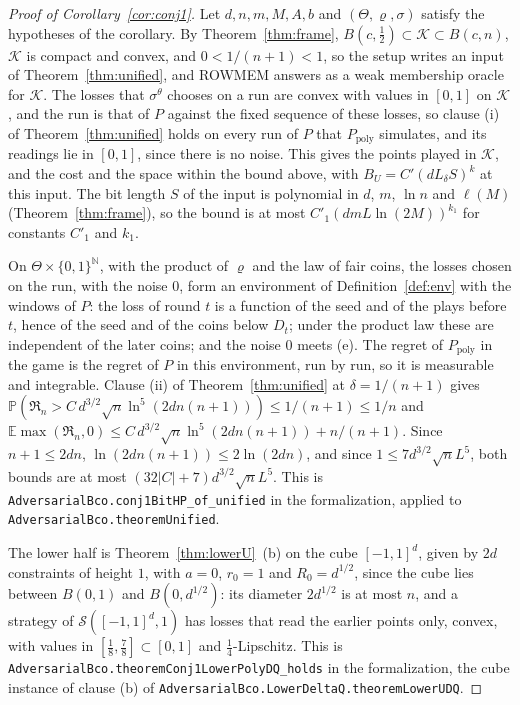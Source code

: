 \documentclass[11pt]{amsart}
\theoremstyle{definition}
\numberwithin{equation}{section}
\newcommand{\E}{\mathbb{E}}
\newcommand{\Prob}{\mathbb{P}}
\newcommand{\cK}{\mathcal{K}}
\newcommand{\Reg}{\mathfrak{R}}
\begin{document}
\begin{proof}[Proof of Corollary~\ref{cor:conj1}]
Let $d,n,m,M,A,b$ and $(\Theta,\varrho,\sigma)$ satisfy the hypotheses of the corollary. By Theorem~\ref{thm:frame}, $B(c,\frac12)\subset\cK\subset B(c,n)$, $\cK$ is compact and convex, and $0<1/(n+1)<1$, so the setup writes an input of Theorem~\ref{thm:unified}, and ROWMEM answers as a weak membership oracle for $\cK$. The losses that $\sigma^\theta$ chooses on a run are convex with values in $[0,1]$ on $\cK$, and the run is that of $P$ against the fixed sequence of these losses, so clause (i) of Theorem~\ref{thm:unified} holds on every run of $P$ that $P_{\mathrm{poly}}$ simulates, and its readings lie in $[0,1]$, since there is no noise. This gives the points played in $\cK$, and the cost and the space within the bound above, with $B_U=C'(dL_\delta S)^k$ at this input. The bit length $S$ of the input is polynomial in $d$, $m$, $\ln n$ and $\ell(M)$ (Theorem~\ref{thm:frame}), so the bound is at most $C'_1(dmL\ln(2M))^{k_1}$ for constants $C'_1$ and $k_1$.

On $\Theta\times\{0,1\}^{\mathbb N}$, with the product of $\varrho$ and the law of fair coins, the losses chosen on the run, with the noise $0$, form an environment of Definition~\ref{def:env} with the windows of $P$: the loss of round $t$ is a function of the seed and of the plays before $t$, hence of the seed and of the coins below $D_t$; under the product law these are independent of the later coins; and the noise $0$ meets (e). The regret of $P_{\mathrm{poly}}$ in the game is the regret of $P$ in this environment, run by run, so it is measurable and integrable. Clause (ii) of Theorem~\ref{thm:unified} at $\delta=1/(n+1)$ gives $\Prob(\Reg_n>C\,d^{3/2}\sqrt n\ln^5(2dn(n+1)))\le1/(n+1)\le1/n$ and $\E\max(\Reg_n,0)\le C\,d^{3/2}\sqrt n\ln^5(2dn(n+1))+n/(n+1)$. Since $n+1\le2dn$, $\ln(2dn(n+1))\le2\ln(2dn)$, and since $1\le7d^{3/2}\sqrt nL^5$, both bounds are at most $(32|C|+7)d^{3/2}\sqrt nL^5$.
This is \texttt{AdversarialBco.conj1BitHP\_of\_unified} in the formalization, applied to \texttt{AdversarialBco.theoremUnified}.

The lower half is Theorem~\ref{thm:lowerU}~(b) on the cube $[-1,1]^d$, given by $2d$ constraints of height $1$, with $a=0$, $r_0=1$ and $R_0=d^{1/2}$, since the cube lies between $B(0,1)$ and $B(0,d^{1/2})$: its diameter $2d^{1/2}$ is at most $n$, and a strategy of $\mathcal S([-1,1]^d,1)$ has losses that read the earlier points only, convex, with values in $[\frac18,\frac78]\subset[0,1]$ and $\frac14$-Lipschitz. This is \texttt{AdversarialBco.\allowbreak theoremConj1LowerPolyDQ\_holds} in the formalization, the cube instance of clause (b) of \texttt{AdversarialBco.\allowbreak LowerDeltaQ.\allowbreak theoremLowerUDQ}.
\end{proof}
\end{document}
